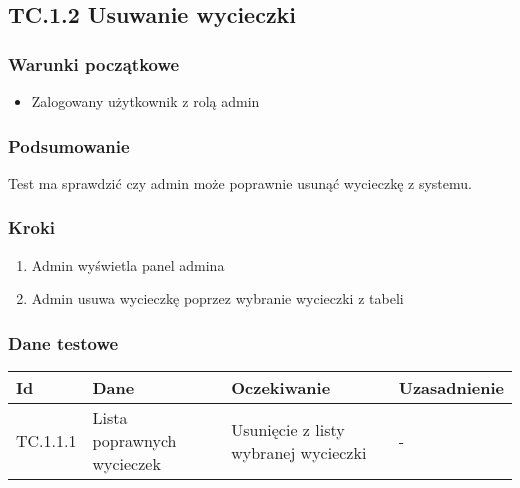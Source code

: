 \documentclass[a4paper,15pt]{article}
\begin{document}
\newpage
\begin{framed}
\subsection{TC.1.2 Usuwanie wycieczki}


\vspace{0.5cm}

\subsubsection{Warunki początkowe}
\begin{itemize}
\item Zalogowany użytkownik z rolą admin
\end{itemize}

\subsubsection{Podsumowanie}
Test ma sprawdzić czy admin może poprawnie usunąć wycieczkę z systemu.

\subsubsection{Kroki}
\begin{enumerate}
\item Admin wyświetla panel admina
\item Admin usuwa wycieczkę poprzez wybranie wycieczki z tabeli
\end{enumerate}

\subsubsection{Dane testowe}

\begin{center}
\begin{tabular}{ |C{1.5cm}|C{3cm}|C{4cm}|C{4cm}| } 
 \hline
 \textbf{Id} & \textbf{Dane} & \textbf{Oczekiwanie} & \textbf{Uzasadnienie} \\ \hline
 TC.1.1.1 & Lista poprawnych wycieczek & Usunięcie z listy wybranej wycieczki & - \\ \hline
\end{tabular}
\end{center}

\end{framed}
\end{document}
